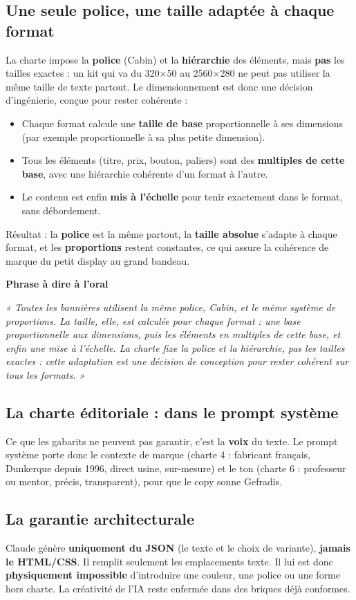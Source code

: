 \documentclass[11pt,a4paper]{article}
\newcommand{\phrasea}[1]{%
  \begin{phrasebox}
  {\bfseries\color{gefblue}\textsf{Phrase à dire à l'oral}}\par\smallskip
  \itshape #1
  \end{phrasebox}%
}
\begin{document}
\subsection{Une seule police, une taille adaptée à chaque format}
La charte impose la \textbf{police} (Cabin) et la \textbf{hiérarchie} des éléments, mais
\textbf{pas} les tailles exactes : un kit qui va du 320×50 au 2560×280 ne peut pas
utiliser la même taille de texte partout. Le dimensionnement est donc une décision
d'ingénierie, conçue pour rester cohérente :
\begin{itemize}[leftmargin=1.4em]
  \item Chaque format calcule une \textbf{taille de base} proportionnelle à ses
        dimensions (par exemple proportionnelle à sa plus petite dimension).
  \item Tous les éléments (titre, prix, bouton, paliers) sont des \textbf{multiples de
        cette base}, avec une hiérarchie cohérente d'un format à l'autre.
  \item Le contenu est enfin \textbf{mis à l'échelle} pour tenir exactement dans le
        format, sans débordement.
\end{itemize}
Résultat : la \textbf{police} est la même partout, la \textbf{taille absolue} s'adapte à
chaque format, et les \textbf{proportions} restent constantes, ce qui assure la cohérence
de marque du petit display au grand bandeau.

\phrasea{« Toutes les bannières utilisent la même police, Cabin, et le même système de
proportions. La taille, elle, est calculée pour chaque format : une base proportionnelle
aux dimensions, puis les éléments en multiples de cette base, et enfin une mise à
l'échelle. La charte fixe la police et la hiérarchie, pas les tailles exactes : cette
adaptation est une décision de conception pour rester cohérent sur tous les formats. »}

\subsection{La charte éditoriale : dans le prompt système}
Ce que les gabarits ne peuvent pas garantir, c'est la \textbf{voix} du texte. Le
prompt système porte donc le contexte de marque (charte 4 : fabricant français,
Dunkerque depuis 1996, direct usine, sur-mesure) et le ton (charte 6 : professeur
ou mentor, précis, transparent), pour que le copy sonne Gefradis.

\subsection{La garantie architecturale}
Claude génère \textbf{uniquement du JSON} (le texte et le choix de variante),
\textbf{jamais le HTML/CSS}. Il remplit seulement les emplacements texte. Il lui
est donc \textbf{physiquement impossible} d'introduire une couleur, une police ou
une forme hors charte. La créativité de l'IA reste enfermée dans des briques déjà
conformes.
\end{document}
